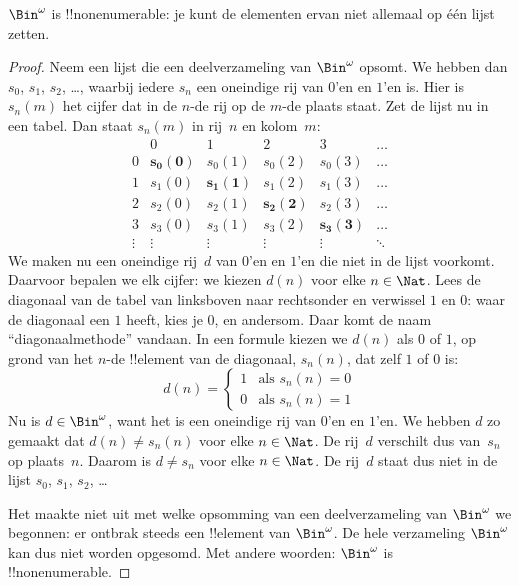 \documentclass[openany]{memoir}
\begin{document}
\begin{thm}
$\Bin^\omega$ is !!{nonenumerable}: je kunt de elementen ervan niet
allemaal op één lijst zetten.
\end{thm}

\begin{proof}
Neem een lijst die een deelverzameling van $\Bin^\omega$ opsomt. We
hebben dan $s_{0}$, $s_{1}$, $s_{2}$, \dots{}, waarbij iedere $s_n$ een
oneindige rij van $0$'en en $1$'en is. Hier is $s_n(m)$ het cijfer dat
in de $n$-de rij op de $m$-de plaats staat. Zet de lijst nu in een tabel. Dan staat
$s_n(m)$ in rij~$n$ en kolom~$m$:
\[
\begin{array}{c|c|c|c|c|c}
& 0 & 1 & 2 & 3 & \dots \\\hline
0 & \mathbf{s_{0}(0)} & s_{0}(1) & s_{0}(2) & s_0(3) & \dots \\\hline
1 & s_{1}(0)& \mathbf{s_{1}(1)} & s_1(2) & s_1(3) & \dots \\\hline
2 & s_{2}(0)& s_{2}(1) & \mathbf{s_2(2)} & s_2(3) & \dots \\\hline
3 & s_{3}(0)& s_{3}(1) & s_3(2) & \mathbf{s_3(3)} & \dots \\\hline
\vdots & \vdots & \vdots & \vdots & \vdots & \mathbf{\ddots}
\end{array}
\]
We maken nu een oneindige rij~$d$ van $0$'en en $1$'en die niet in de
lijst voorkomt. Daarvoor bepalen we elk cijfer: we kiezen
$d(n)$ voor elke $n \in \Nat$. Lees de diagonaal van de tabel van
linksboven naar rechtsonder en verwissel $1$ en $0$: waar de diagonaal
een $1$ heeft, kies je $0$, en andersom. Daar komt de naam
``diagonaalmethode'' vandaan. In een formule kiezen we $d(n)$ als $0$
of $1$, op grond van het $n$-de !!{element} van de diagonaal, $s_n(n)$,
dat zelf $1$ of $0$ is:
\[
d(n) =
\begin{cases}
1 & \text{als $s_{n}(n) = 0$}\\
0 & \text{als $s_{n}(n) = 1$}
\end{cases}
\]
Nu is $d \in \Bin^\omega$, want het is een oneindige rij van $0$'en en
$1$'en. We hebben $d$ zo gemaakt dat $d(n) \neq s_n(n)$ voor elke
$n \in \Nat$. De rij~$d$ verschilt dus van~$s_n$ op plaats~$n$.
Daarom is $d \neq s_n$ voor elke $n\in \Nat$. De rij~$d$ staat dus
niet in de lijst $s_0$, $s_1$, $s_2$, \dots

Het maakte niet uit met welke opsomming van een deelverzameling van
$\Bin^\omega$ we begonnen: er ontbrak steeds een !!{element} van
$\Bin^\omega$. De hele verzameling $\Bin^\omega$ kan dus niet worden
opgesomd. Met andere woorden: $\Bin^\omega$ is !!{nonenumerable}.
\end{proof}
\end{document}
